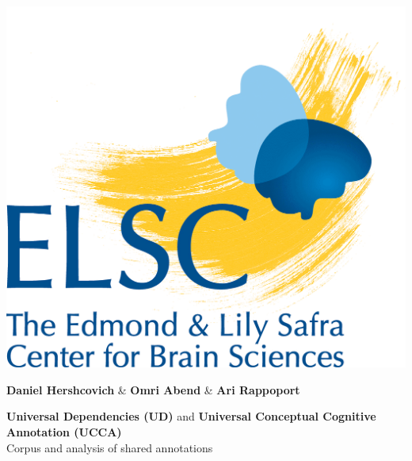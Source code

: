 \documentclass[extrafontsizes,60pt,twocolumn]{memoir}
\begin{document}
\begin{strip}
  \begin{center}
  \end{center}
  \begin{center}
  \hspace{6in}
  \begin{minipage}[b]{.08\linewidth}
    \includegraphics[width=\linewidth]{elsc_logo.png}
    \vspace{-1cm}
  \end{minipage}
  \hspace{2in}
  \begin{minipage}[b]{.6\linewidth}
    \centering
    \HUGE\textbf{Daniel Hershcovich} \& \textbf{Omri Abend} \& \textbf{Ari Rappoport}
    
    \vspace{1cm}
    \titlespacing*{\section}{0pt}{8mm}{5mm}
    \begin{adjustbox}{margin=5mm,frame,minipage=\linewidth,center}
      \LARGE\color{Navy}\centering
      \textbf{\color{red} Universal Dependencies (UD)} and
      \textbf{\color{blue} Universal Conceptual Cognitive Annotation (UCCA)} \\
      \Large Corpus and analysis of shared annotations
    \end{adjustbox}
    

\end{minipage}
\end{center}
\end{strip}
\end{document}
